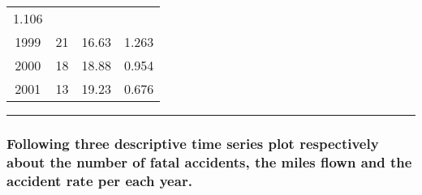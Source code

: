 \documentclass[]{article}
\begin{document}
\begin{longtable}[]{@{}cccc@{}}
\begin{minipage}[t]{0.10\columnwidth}
1.106\strut
\end{minipage}\tabularnewline
\begin{minipage}[t]{0.09\columnwidth}\centering\strut
1999\strut
\end{minipage} & \begin{minipage}[t]{0.10\columnwidth}\centering\strut
21\strut
\end{minipage} & \begin{minipage}[t]{0.10\columnwidth}\centering\strut
16.63\strut
\end{minipage} & \begin{minipage}[t]{0.10\columnwidth}\centering\strut
1.263\strut
\end{minipage}\tabularnewline
\begin{minipage}[t]{0.09\columnwidth}\centering\strut
2000\strut
\end{minipage} & \begin{minipage}[t]{0.10\columnwidth}\centering\strut
18\strut
\end{minipage} & \begin{minipage}[t]{0.10\columnwidth}\centering\strut
18.88\strut
\end{minipage} & \begin{minipage}[t]{0.10\columnwidth}\centering\strut
0.954\strut
\end{minipage}\tabularnewline
\begin{minipage}[t]{0.09\columnwidth}\centering\strut
2001\strut
\end{minipage} & \begin{minipage}[t]{0.10\columnwidth}\centering\strut
13\strut
\end{minipage} & \begin{minipage}[t]{0.10\columnwidth}\centering\strut
19.23\strut
\end{minipage} & \begin{minipage}[t]{0.10\columnwidth}\centering\strut
0.676\strut
\end{minipage}\tabularnewline
\bottomrule
\end{longtable}

\begin{center}\rule{0.5\linewidth}{\linethickness}\end{center}

\subsubsection{Following three descriptive time series plot respectively
about the number of fatal accidents, the miles flown and the accident
rate per each
year.}\label{following-three-descriptive-time-series-plot-respectively-about-the-number-of-fatal-accidents-the-miles-flown-and-the-accident-rate-per-each-year.}
\end{document}
